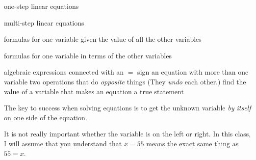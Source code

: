 \documentclass[fleqn,letterpaper,12pt,printwatermark=false]{memoir}
\begin{document}
 

\newcommand{\myClassName}{Pre-AP Algebra 2}
\newcommand{\myUnitNumber}{1}
\newcommand{\myUnitTitle}{Introduction to Functions}
\newcommand{\myLessonNumber}{5}
\newcommand{\myLessonTitle}{Solving Linear Equations and Formulas}



\pagestyle{myPagestyle}

\checkandfixthelayout
{}

\begin{myNotesHeader}
    \item {} one-step linear equations
    \item {} multi-step linear equations
    \item {} formulas for one variable given the value of all the other variables
    \item {} formulas for one variable in terms of the other variables
\end{myNotesHeader}

\begin{myVocabulary}
    {
        algebraic expressions connected with an $=$ sign 
    }
    {
        an equation with more than one variable
    }
    {
        two operations that do \emph{opposite} things
        (They \emph{undo} each other.)
    }
    {
        find the value of a variable that makes an equation a true statement
    }
\end{myVocabulary}

\begin{myLesson}[][]
    The key to success when solving equations is to get the unknown variable \emph{by itself}
    on one side of the equation.
    \begin{myLessonBox}
        It is not really important whether the variable is on the left or right.
        In this class, I will assume that you understand that
        $x=55$ means the exact same thing as $55=x$.
    \end{myLessonBox}
\end{myLesson}
\end{document}
